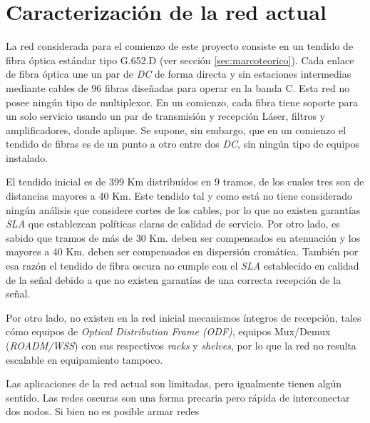 \section{Caracterización de la red actual}
\label{sec:caracterizacion}

La red considerada para el comienzo de este proyecto consiste en un
tendido de fibra óptica estándar tipo G.652.D (ver sección
\ref{sec:marcoteorico}). Cada enlace de fibra óptica une un par de
\emph{DC} de forma directa y sin estaciones intermedias mediante
cables de 96 fibras diseñadas para operar en la banda C. Esta red no
posee ningún tipo de multiplexor. En un comienzo, cada fibra tiene
soporte para un solo servicio usando un par de transmisión y recepción
Láser, filtros y amplificadores, donde aplique. Se supone, sin
embargo, que en un comienzo el tendido de fibras es de un punto a otro
entre dos \emph{DC}, sin ningún tipo de equipos instalado.

El tendido inicial es de 399 Km distribuídos en 9 tramos, de los
cuales tres son de distancias mayores a 40 Km. Este tendido tal y como
está no tiene considerado ningún análisis que considere cortes de los
cables, por lo que no existen garantías \emph{SLA} que establezcan
políticas claras de calidad de servicio. Por otro lado, es sabido que
tramos de más de 30 Km. deben ser compensados en atenuación y los
mayores a 40 Km. deben ser compensados en dispersión
cromática. También por esa razón el tendido de fibra oscura no cumple
con el \emph{SLA} establecido en calidad de la señal debido a que no
existen garantías de una correcta recepción de la señal.

Por otro lado, no existen en la red inicial mecanismos íntegros de
recepción, tales cómo equipos de \textit{Optical Distribution Frame
  (ODF)}, equipos Mux/Demux (\textit{ROADM/WSS}) con sus respectivos
\textit{racks} y \textit{shelves}, por lo que la red no resulta
escalable en equipamiento tampoco.

Las aplicaciones de la red actual son limitadas, pero igualmente
tienen algún sentido. Las redes oscuras son una forma precaria pero rápida de interconectar dos nodos. Si bien no es posible armar redes 



